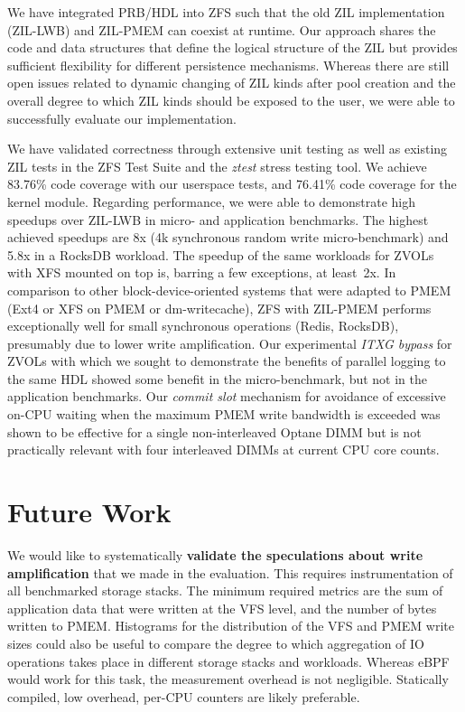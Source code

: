 \documentclass[12pt,a4paper,twoside]{book}
\begin{document}
{We have integrated PRB/HDL into ZFS such that the old ZIL implementation (ZIL-LWB) and ZIL-PMEM can coexist at runtime.
Our approach shares the code and data structures that define the logical structure of the ZIL but provides sufficient flexibility for different persistence mechanisms.
Whereas there are still open issues related to dynamic changing of ZIL kinds after pool creation and the overall degree to which ZIL kinds should be exposed to the user, we were able to successfully evaluate our implementation.

We have validated correctness through extensive unit testing as well as existing ZIL tests in the ZFS Test Suite and the \textit{ztest} stress testing tool.
We achieve 83.76\% code coverage with our userspace tests, and 76.41\% code coverage for the kernel module.
Regarding performance, we were able to demonstrate high speedups over ZIL-LWB in micro- and application benchmarks.
The highest achieved speedups are 8x (4k synchronous random write micro-benchmark) and 5.8x in a RocksDB workload.
The speedup of the same workloads for ZVOLs with XFS mounted on top is, barring a few exceptions, at least~2x.
In comparison to other block-device-oriented systems that were adapted to PMEM (Ext4 or XFS on PMEM or dm-writecache), ZFS with ZIL-PMEM performs exceptionally well for small synchronous operations (Redis, RocksDB), presumably due to lower write amplification.
Our experimental \textit{ITXG bypass} for ZVOLs with which we sought to demonstrate the benefits of parallel logging to the same HDL showed some benefit in the micro-benchmark, but not in the application benchmarks.
Our \textit{commit slot} mechanism for avoidance of excessive on-CPU waiting when the maximum PMEM write bandwidth is exceeded was shown to be effective for a single non-interleaved Optane DIMM but is not practically relevant with four interleaved DIMMs at current CPU core counts.

\section{Future Work}\label{sec:futurework}

We would like to systematically \textbf{validate the speculations about write amplification} that we made in the evaluation.
This requires instrumentation of all benchmarked storage stacks.
The minimum required metrics are the sum of application data that were written at the VFS level, and the number of bytes written to PMEM.
Histograms for the distribution of the VFS and PMEM write sizes could also be useful to compare the degree to which aggregation of IO operations takes place in different storage stacks and workloads.
Whereas eBPF would work for this task, the measurement overhead is not negligible.
Statically compiled, low overhead, per-CPU counters are likely preferable.

}
\end{document}
